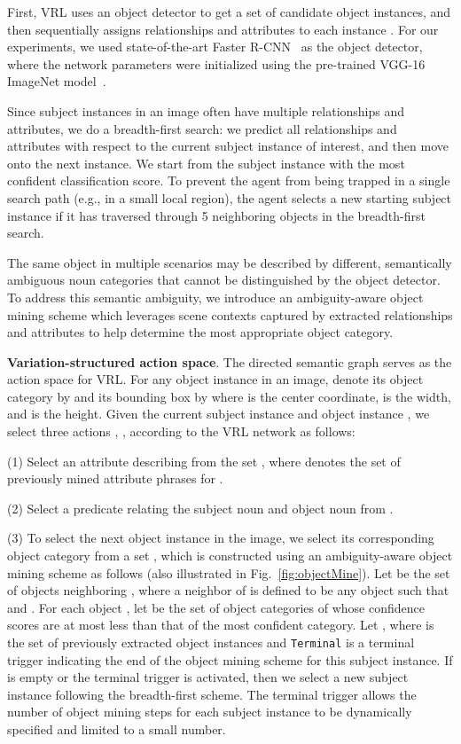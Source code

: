 \documentclass[10pt,twocolumn,letterpaper]{article}
\begin{document}
First, VRL uses an object detector to get a set  of candidate object instances, and then sequentially assigns relationships and attributes to each instance . For our experiments, we used state-of-the-art Faster R-CNN~\cite{ren2015faster} as the object detector, where the network parameters were initialized using the pre-trained VGG-16 ImageNet model~\cite{simonyan2014very}.

Since subject instances in an image often have multiple relationships and attributes, we do a breadth-first search: we predict all relationships and attributes with respect to the current subject instance of interest, and then move onto the next instance. {We start from the subject instance with the most confident classification score. To prevent the agent from being trapped in a single search path (e.g., in a small local region), the agent selects a new starting subject instance if it has traversed through 5 neighboring objects in the breadth-first search.}

The same object in multiple scenarios may be described by different, semantically ambiguous noun categories that cannot be distinguished by the object detector. To address this semantic ambiguity, we introduce an ambiguity-aware object mining scheme which leverages scene contexts captured by extracted relationships and attributes to help determine the most appropriate object category.

\textbf{Variation-structured action space}. The directed semantic graph  serves as the action space for VRL. For {any object} instance  in an image, denote its {object} category by  and its bounding box by  where  is the center coordinate,  is the width, and  is the height. Given the current subject instance  and { object} instance , we select three actions , ,  according to the VRL network as follows:

(1) Select an attribute  describing  from the set , where  denotes the {set of} previously mined attribute {phrases} for .

(2) Select a predicate  relating the subject noun  and object noun  {from} .

(3) To select the next object instance  in the image, we select its corresponding object category  from a set , which is constructed using an ambiguity-aware object mining scheme as follows {(also illustrated in Fig.~\ref{fig:objectMine})}. Let  be the set of objects neighboring , where a neighbor of  is defined to be any object  such that  and . For each object , let  be the set of object categories of  whose confidence scores are at most  less than that of the most confident category. Let , where  is the set of previously extracted object instances and \texttt{\small Terminal} is a terminal trigger indicating the end of the object mining scheme for this subject instance. If  is empty or the terminal trigger is activated, then we select a new subject instance following the breadth-first scheme. The terminal trigger allows the number of object mining steps for each subject instance to be dynamically specified and limited to a small number.
\end{document}
